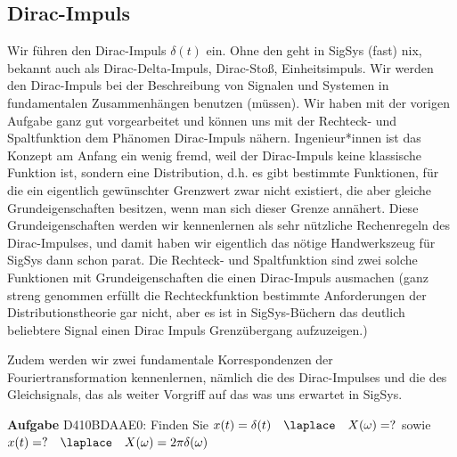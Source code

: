 \cleardoublepage
\subsection{Dirac-Impuls}
\label{sec:D410BDAAE0}
\begin{Ziel}
Wir führen den Dirac-Impuls $\delta(t)$ ein.
Ohne den geht in SigSys (fast) nix, bekannt auch als
Dirac-Delta-Impuls, Dirac-Stoß, Einheitsimpuls.
Wir werden den Dirac-Impuls bei der Beschreibung von Signalen und Systemen
in fundamentalen Zusammenhängen benutzen (müssen).
Wir haben mit der vorigen Aufgabe ganz gut vorgearbeitet und können uns
mit der Rechteck- und Spaltfunktion dem Phänomen Dirac-Impuls nähern.
Ingenieur*innen ist das Konzept am Anfang ein wenig fremd, weil
der Dirac-Impuls keine klassische Funktion ist, sondern eine Distribution, d.h.
es gibt bestimmte Funktionen, für die ein eigentlich gewünschter Grenzwert zwar nicht existiert,
die aber gleiche Grundeigenschaften besitzen, wenn man sich dieser Grenze annähert.
Diese Grundeigenschaften werden wir kennenlernen als sehr nützliche
Rechenregeln des Dirac-Impulses, und damit haben wir eigentlich das nötige
Handwerkszeug für SigSys dann schon parat.
Die Rechteck- und Spaltfunktion sind zwei solche Funktionen mit
Grundeigenschaften die einen Dirac-Impuls ausmachen (ganz streng genommen erfüllt
die Rechteckfunktion bestimmte Anforderungen der Distributionstheorie gar nicht,
aber es ist in SigSys-Büchern das deutlich beliebtere Signal einen Dirac Impuls
Grenzübergang aufzuzeigen.)

Zudem werden wir zwei fundamentale Korrespondenzen der Fouriertransformation
kennenlernen, nämlich die des Dirac-Impulses und die des Gleichsignals, das als
weiter Vorgriff auf das was uns erwartet in SigSys.
\end{Ziel}
\textbf{Aufgabe} {\tiny D410BDAAE0}:
Finden Sie $x(t)=\delta(t)\quad \laplace \quad X(\omega)=?$ sowie
$x(t)= ? \quad \laplace \quad X(\omega)=2\pi \delta(\omega)$
